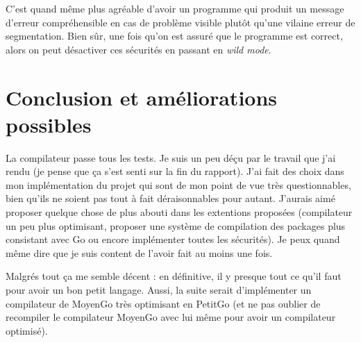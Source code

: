 \documentclass[11pt]{article}
\begin{document}
C'est quand même plus agréable d'avoir un programme qui produit un message d'erreur compréhensible en cas de problème visible plutôt qu'une vilaine erreur de segmentation. Bien sûr, une fois qu'on est assuré que le programme est correct, alors on peut désactiver ces sécurités en passant en \textit{wild mode}.

\section{Conclusion et améliorations possibles}

La compilateur passe tous les tests. Je suis un peu déçu par le travail que j'ai rendu (je pense que ça s'est senti sur la fin du rapport). J'ai fait des choix dans mon implémentation du projet qui sont de mon point de vue très questionnables, bien qu'ils ne soient pas tout à fait déraisonnables pour autant. J'aurais aimé proposer quelque chose de plus abouti dans les extentions proposées (compilateur un peu plus optimisant, proposer une système de compilation des packages plus consistant avec Go ou encore implémenter toutes les sécurités). Je peux quand même dire que je suis content de l'avoir fait au moins une fois.

Malgrés tout ça me semble décent : en définitive, il y presque tout ce qu'il faut pour avoir un bon petit langage. Aussi, la suite serait d'implémenter un compilateur de MoyenGo très optimisant en PetitGo (et ne pas oublier de recompiler le compilateur MoyenGo avec lui même pour avoir un compilateur optimisé).
\end{document}
